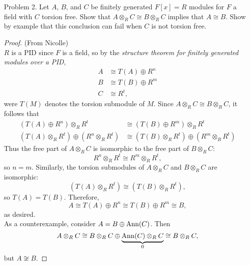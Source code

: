 \documentclass{article}
\begin{document}
\begin{subsection}{Problem 2.}
  Let $A$, $B$, and $C$ be finitely generated $F[x] = R$ modules for $F$ a field
  with $C$ torsion free. Show that $A \otimes_R C \cong B \otimes_R C$ implies
  that $A \cong B$.
  Show by example that this conclusion can fail when $C$ is not torsion free.
\end{subsection}
\begin{proof}(From Nicolle)\\
  $R$ is a PID since $F$ is a field, so by the
  \textit{structure theorem for finitely generated modules over a PID},
  \begin{align*}
    A &\cong T(A) \oplus R^n \\
    B &\cong T(B) \oplus R^m \\
    C &\cong R^t,
  \end{align*} were $T(M)$ denotes the torsion submodule of $M$.
  Since $A \otimes_R C \cong B \otimes_R C$, it follows that \begin{align*}
    (T(A) \oplus R^n) \otimes_R R^t &\cong (T(B) \oplus R^m) \otimes_R R^t \\
    (T(A) \otimes_R R^t) \oplus (R^n \otimes_R R^t) &\cong (T(B) \otimes_R R^t) \oplus (R^m \otimes_R R^t)
  \end{align*}
  Thus the free part of $A \otimes_R C$ is isomorphic to the free part of
  $B \otimes_R C$: \[
    R^n \otimes_R R^t \cong R^m \otimes_R R^t,
  \] so $n = m$. Similarly, the torsion submodules of $A \otimes_R C$ and
  $B \otimes_R C$ are isomorphic: \[
    (T(A) \otimes_R R^t) \cong (T(B) \otimes_R R^t),
  \] so $T(A) = T(B)$. Therefore, \[
    A \cong T(A) \oplus R^n \cong T(B) \oplus R^m \cong B,
  \] as desired.
  \\

  As a counterexample, consider $A = B \oplus \operatorname{Ann}(C)$. Then \[
    A \otimes_R C
    \cong B \otimes_R C \oplus \underbrace{\operatorname{Ann}(C) \otimes_R C}_0
    \cong B \otimes_R C,
  \] but $A \not\cong B$.
\end{proof}
\pagebreak
\end{document}
